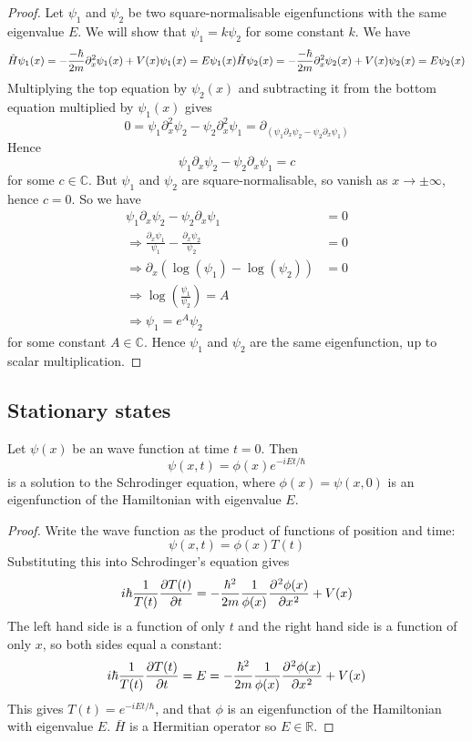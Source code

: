 \begin{proof}
	Let $\psi_1$ and $\psi_2$ be two square-normalisable eigenfunctions with the same eigenvalue $E$. We will show that $\psi_1 = k \psi_2$ for some constant $k$. We have
	\[
		\hat{H} \psi_1(x) = -\frac{-\hbar}{2m} \partial_x^2 \psi_1(x) + V(x) \psi_1(x) = E \psi_1(x) \\
		\hat{H} \psi_2(x) = -\frac{-\hbar}{2m} \partial_x^2 \psi_2(x) + V(x) \psi_2(x) = E \psi_2(x)
	\]
	Multiplying the top equation by $\psi_2(x)$ and subtracting it from the bottom equation multiplied by $\psi_1(x)$ gives
	\[
		0 = \psi_1 \partial_x^2 \psi_2 - \psi_2 \partial_x^2 \psi_1 = \partial_ (\psi_1 \partial_x \psi_2 - \psi_2 \partial_x \psi_1)
	\]
	Hence
	\[
		\psi_1 \partial_x \psi_2 - \psi_2 \partial_x \psi_1 = c
	\]
	for some $c \in \mathbb{C}$. But $\psi_1$ and $\psi_2$ are square-normalisable, so vanish as $x \to \pm\infty$, hence $c = 0$. So we have
	\[
		\begin{aligned}
			\psi_1 \partial_x \psi_2 - \psi_2 \partial_x \psi_1 & = 0 \\
			\Longrightarrow \frac{\partial_x \psi_1}{\psi_1} - \frac{\partial_x \psi_2}{\psi_2} & = 0 \\
			\Longrightarrow \partial_x (\log(\psi_1) - \log(\psi_2)) & = 0 \\
			\Longrightarrow \log \left( \frac{\psi_1}{\psi_2} \right) = A \\
			\Longrightarrow \psi_1 = e^A \psi_2
		\end{aligned}
	\]
	for some constant $A \in \mathbb{C}$. Hence $\psi_1$ and $\psi_2$ are the same eigenfunction, up to scalar multiplication.
\end{proof}

\subsection{Stationary states}

\begin{proposition}
	Let $\psi(x)$ be an wave function at time $t = 0$. Then
	\[
		\psi(x, t) = \phi(x) e^{-iEt/\hbar}
	\]
	is a solution to the Schrodinger equation, where $\phi(x) = \psi(x, 0)$ is an eigenfunction of the Hamiltonian with eigenvalue $E$.
\end{proposition}

\begin{proof}
	Write the wave function as the product of functions of position and time:
	\[
		\psi(x, t) = \phi(x) T(t)
	\]
	Substituting this into Schrodinger's equation gives
	\[
		i\hbar \frac{1}{T(t)} \diffp{T(t)}{t} = -\frac{\hbar^2}{2m} \frac{1}{\phi(x)} \diffp[2]{\phi(x)}{x} + V(x)
	\]
	The left hand side is a function of only $t$ and the right hand side is a function of only $x$, so both sides equal a constant:
	\[
		i\hbar \frac{1}{T(t)} \diffp{T(t)}{t} = E = -\frac{\hbar^2}{2m} \frac{1}{\phi(x)} \diffp[2]{\phi(x)}{x} + V(x)
	\]
	This gives $T(t) = e^{-iEt/\hbar}$, and that $\phi$ is an eigenfunction of the Hamiltonian with eigenvalue $E$. $\bar{H}$ is a Hermitian operator so $E \in \mathbb{R}$.
\end{proof}


